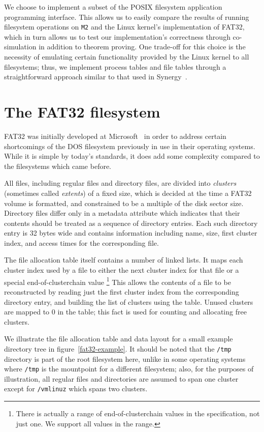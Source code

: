 \documentclass[submission,copyright,creativecommons]{eptcs}
\begin{document}
We choose to implement a subset of the POSIX filesystem application
programming interface. This allows us to easily compare the results of
running filesystem operations on \texttt{M2} and the Linux kernel's
implementation of FAT32, which in turn allows us to test our
implementation's correctness through co-simulation in addition to
theorem proving. One trade-off for this choice is the necessity of
emulating certain functionality provided by the Linux kernel to all
filesystems; thus, we implement process tables and file tables through
a straightforward approach similar to that used in
Synergy~\cite{bevier1996executable}.

\section{The FAT32 filesystem}

FAT32 was initially developed at Microsoft~\cite{microsoft2000} in
order to address certain shortcomings of the DOS filesystem previously
in use in their operating systems. While it is simple by today's
standards, it does add some complexity compared to the filesystems
which came before.

All files, including regular files and directory files, are divided into
\textit{clusters} (sometimes called \textit{extents}) of a fixed size,
which is decided at the time a FAT32 volume is formatted, and
constrained to be a multiple of the disk sector size. Directory files
differ only in a metadata attribute which indicates that their contents
should be treated as a sequence of directory entries. Each such
directory entry is 32 bytes wide and contains information including
name, size, first cluster index, and access times for the
corresponding file.

The file allocation table itself contains a number of linked lists. It
maps each cluster index used by a file to either the next cluster
index for that file or a special end-of-clusterchain value \footnote{
There is actually a range of end-of-clusterchain values in the
specification, not just one. We support all values in the range.} This
allows the contents of a file to be reconstructed by
reading just the first cluster index from the corresponding directory
entry, and building the list of clusters using the table. Unused
clusters are mapped to 0 in the table; this fact is used for counting
and allocating free clusters.

We illustrate the file allocation table and data layout for a small
example directory tree in figure~\ref{fat32-example}. It should be
noted that the \texttt{/tmp} directory is part of the root filesystem
here, unlike in some operating systems where \texttt{/tmp} is the
mountpoint for a different filesystem; also, for the purposes of
illustration, all regular files and directories are assumed to span
one cluster except for \texttt{/vmlinuz} which spans two clusters.
\end{document}
